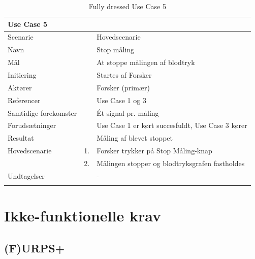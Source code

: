 \begin{longtabu} to  %
	{\large \textbf{Use Case 5}} && \\
	\toprule
	Scenarie	 	&& Hovedscenarie\\
	Navn 			&& Stop måling \\
	Mål 			&& At stoppe målingen af blodtryk\\
	Initiering 		&& Startes af Forsker\\
	Aktører 		&& Forsker (primær)\\
	Referencer 		&& Use Case 1 og 3  \\
	Samtidige forekomster  &&  Ét signal pr. måling\\
	Forudsætninger 	&& Use Case 1 er kørt succesfuldt, Use Case 3 kører\\
	Resultat 		&& Måling af blevet stoppet\\ \midrule
	Hovedscenarie &    1. &		Forsker trykker på Stop Måling-knap\\[-1ex] 
	&    2. &   Målingen stopper og blodtryksgrafen fastholdes \\ \midrule	 	
	Undtagelser &    & - 	\\ \bottomrule
	\caption{Fully dressed Use Case 5}
	\label{UC5}
\end{longtabu}

\section{Ikke-funktionelle krav}


\subsection{(F)URPS+}

